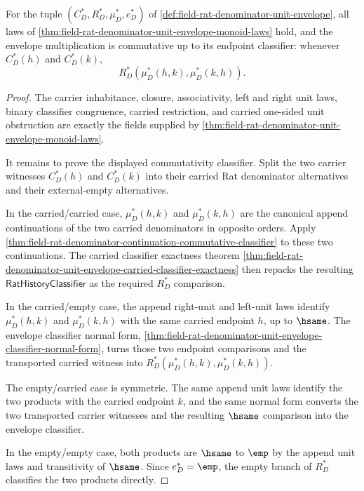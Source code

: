 \begin{theorem}
\label{thm:field-rat-denominator-unit-envelope-commutative-monoid-laws}
For the tuple $(C_D^\ast,R_D^\ast,\mu_D^\ast,e_D^\ast)$ of
\autoref{def:field-rat-denominator-unit-envelope}, all laws of
\autoref{thm:field-rat-denominator-unit-envelope-monoid-laws} hold, and the
envelope multiplication is commutative up to its endpoint classifier: whenever
$C_D^\ast(h)$ and $C_D^\ast(k)$,
$$
R_D^\ast(\mu_D^\ast(h,k),\mu_D^\ast(k,h)).
$$
\end{theorem}
\begin{proof}
The carrier inhabitance, closure, associativity, left and right unit laws,
binary classifier congruence, carried restriction, and carried one-sided unit
obstruction are exactly the fields supplied by
\autoref{thm:field-rat-denominator-unit-envelope-monoid-laws}.

It remains to prove the displayed commutativity classifier. Split the two
carrier witnesses $C_D^\ast(h)$ and $C_D^\ast(k)$ into their carried Rat
denominator alternatives and their external-empty alternatives.

In the carried/carried case, $\mu_D^\ast(h,k)$ and $\mu_D^\ast(k,h)$ are the
canonical append continuations of the two carried denominators in opposite
orders. Apply
\autoref{thm:field-rat-denominator-continuation-commutative-classifier} to these
two continuations. The carried classifier exactness theorem
\autoref{thm:field-rat-denominator-unit-envelope-carried-classifier-exactness}
then repacks the resulting $\mathsf{RatHistoryClassifier}$ as the required
$R_D^\ast$ comparison.

In the carried/empty case, the append right-unit and left-unit laws identify
$\mu_D^\ast(h,k)$ and $\mu_D^\ast(k,h)$ with the same carried endpoint $h$,
up to $\hsame$. The envelope classifier normal form,
\autoref{thm:field-rat-denominator-unit-envelope-classifier-normal-form},
turns those two endpoint comparisons and the transported carried witness into
$R_D^\ast(\mu_D^\ast(h,k),\mu_D^\ast(k,h))$.

The empty/carried case is symmetric. The same append unit laws identify the two
products with the carried endpoint $k$, and the same normal form converts the
two transported carrier witnesses and the resulting $\hsame$ comparison into
the envelope classifier.

In the empty/empty case, both products are $\hsame$ to $\emp$ by the append unit
laws and transitivity of $\hsame$. Since $e_D^\ast=\emp$, the empty branch of
$R_D^\ast$ classifies the two products directly.
\end{proof}

